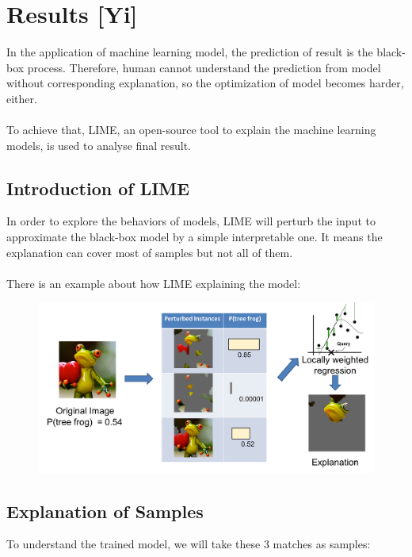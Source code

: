 \documentclass{article}
\begin{document}
\section{Results [Yi]}

In the application of machine learning model, the prediction of result is the black-box process. Therefore, human cannot understand the prediction from model without corresponding explanation, so the optimization of model becomes harder, either.\\
~\\

To achieve that, LIME, an open-source tool to explain the machine learning models, is used to analyse final result. \\

\subsection{Introduction of LIME}
In order to explore the behaviors of models, LIME will perturb the input to approximate the black-box model by a simple interpretable one. It means the explanation can cover most of samples but not all of them.\\
~\\
There is an example about how LIME explaining the model:

\begin{figure}[ht]
\centering
\includegraphics[scale=0.4]{graphs/LIMEintro.png}
\caption{}
\label{fig:label}
\end{figure}

\subsection{Explanation of Samples}
To understand the trained model, we will take these 3 matches as samples:
\end{document}
